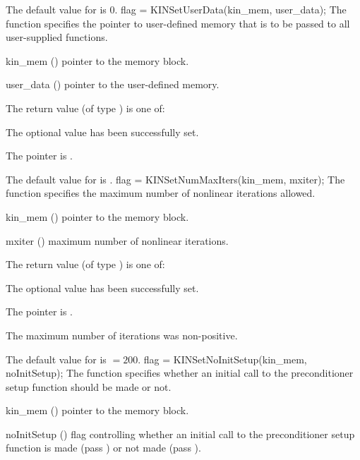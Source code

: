 {
  The default value for  is $0$.
}
{
flag = KINSetUserData(kin\_mem, user\_data);
}
{
  The function  specifies the pointer to user-defined memory
  that is to be passed to all user-supplied functions.
}
{
  \begin{args}
  \item[kin\_mem] ()
    pointer to the {\kinsol} memory block.
  \item[user\_data] ()
    pointer to the user-defined memory.
  \end{args}
}
{
  The return value  (of type ) is one of:
  \begin{args}
  \item[\Id{KIN\_SUCCESS}] 
    The optional value has been successfully set.
  \item[\Id{KIN\_MEM\_NULL}]
    The  pointer is .
  \end{args}
}
{
  The default value for  is .
}
{
flag = KINSetNumMaxIters(kin\_mem, mxiter);
}
{
  The function  specifies the maximum number of 
  nonlinear iterations allowed.
}
{
  \begin{args}
  \item[kin\_mem] ()
    pointer to the {\kinsol} memory block.
  \item[mxiter] ()
    maximum number of nonlinear iterations.
  \end{args}
}
{
  The return value  (of type ) is one of:
  \begin{args}
  \item[\Id{KIN\_SUCCESS}] 
    The optional value has been successfully set.
  \item[\Id{KIN\_MEM\_NULL}]
    The  pointer is .
  \item[\Id{KIN\_ILL\_INPUT}]
    The maximum number of iterations was non-positive.
  \end{args}
}
{
  The default value for  is  $=200$.
}
{
flag = KINSetNoInitSetup(kin\_mem, noInitSetup);
}
{
  The function  specifies whether an initial call
  to the preconditioner setup function should be made or not.
}
{
  \begin{args}[noInitSeti[]
  \item[kin\_mem] ()
    pointer to the {\kinsol} memory block.
  \item[noInitSetup] ()
    flag controlling whether an initial call to the preconditioner setup
    function is made (pass ) or not made (pass ).
  \end{args}
}
